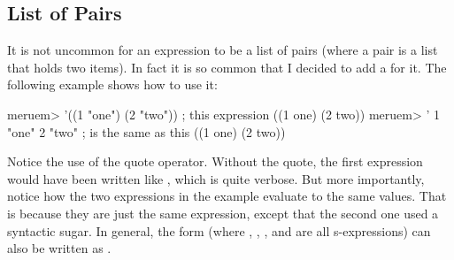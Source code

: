 \subsection{List of Pairs}
It is not uncommon for an expression to be a list of pairs (where a pair is a list that holds two items). In fact it is so common that I decided to add a  for it. The following example shows how to use it:

\begin{REPL}
meruem> '((1 "one") (2 "two"))  ; this expression
((1 one) (2 two))
meruem> '{ 1 "one" 2 "two" }  ; is the same as this
((1 one) (2 two))
\end{REPL}

Notice the use of the quote operator. Without the quote, the first expression would have been written like , which is quite verbose. But more importantly, notice how the two expressions in the example evaluate to the same values. That is because they are just the same expression, except that the second one used a syntactic sugar. In general, the form  (where , , , and  are all s-expressions) can also be written as .